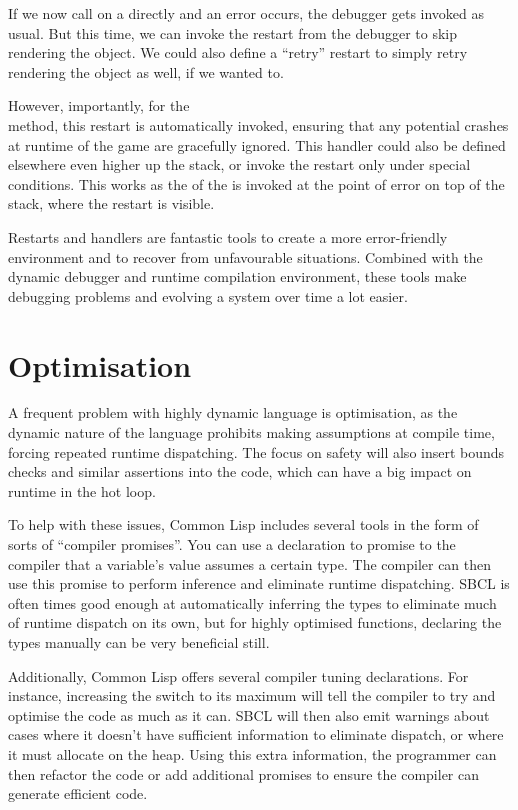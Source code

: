 \documentclass[a4paper]{paper}
\begin{document}
If we now call  on a  directly and an error occurs, the debugger gets invoked as usual. But this time, we can invoke the  restart from the debugger to skip rendering the object. We could also define a ``retry'' restart to simply retry rendering the object as well, if we wanted to.

However, importantly, for the  \\ method, this restart is automatically invoked, ensuring that any potential crashes at runtime of the game are gracefully ignored. This handler could also be defined elsewhere even higher up the stack, or invoke the restart only under special conditions. This works as the  of the  is invoked at the point of error on top of the stack, where the  restart is visible.

Restarts and handlers are fantastic tools to create a more error-friendly environment and to recover from unfavourable situations. Combined with the dynamic debugger and runtime compilation environment, these tools make debugging problems and evolving a system over time a lot easier.

\section{Optimisation}
A frequent problem with highly dynamic language is optimisation, as the dynamic nature of the language prohibits making assumptions at compile time, forcing repeated runtime dispatching. The focus on safety will also insert bounds checks and similar assertions into the code, which can have a big impact on runtime in the hot loop.

To help with these issues, Common Lisp includes several tools in the form of sorts of ``compiler promises''. You can use a declaration to promise to the compiler that a variable's value assumes a certain type. The compiler can then use this promise to perform inference and eliminate runtime dispatching. SBCL is often times good enough at automatically inferring the types to eliminate much of runtime dispatch on its own, but for highly optimised functions, declaring the types manually can be very beneficial still.

Additionally, Common Lisp offers several compiler tuning declarations. For instance, increasing the  switch to its maximum will tell the compiler to try and optimise the code as much as it can. SBCL will then also emit warnings about cases where it doesn't have sufficient information to eliminate dispatch, or where it must allocate on the heap. Using this extra information, the programmer can then refactor the code or add additional promises to ensure the compiler can generate efficient code.
\end{document}
